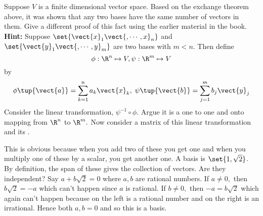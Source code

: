 \begin{enumialphparenastyle}
\begin{ex} Suppose $V$ is a finite dimensional vector space. Based on the
exchange theorem above, it was shown that any two bases have the same number
of vectors in them. Give a different proof of this fact using the earlier
material in the book. \textbf{Hint: }Suppose $\set{\vect{x}_{1}\vect{
,\cdots ,x}_{n}} $ and $\set{\vect{y}_{1}\vect{,\cdots ,y}
_{m}} $ are two bases with $m<n.$ Then define 
\begin{equation*}
\phi :\R^{n}\mapsto V,\psi :\R^{m}\mapsto V
\end{equation*}
by 
\begin{equation*}
\phi \tup{\vect{a}} = \sum_{k=1}^{n}a_{k}\vect{x}
_{k},\;\psi \tup{\vect{b}} = \sum_{j=1}^{m}b_{j}\vect{y}_{j}
\end{equation*}
Consider the linear transformation, $\psi ^{-1}\circ \phi .$ Argue it is a
one to one and onto mapping from $\R^{n}$ to $\R^{m}.$ Now
consider a matrix of this linear transformation and its {\rref}.
\begin{sol}
This is obvious because
when you add two of these you get one and when you multiply one of these by
a scalar, you get another one. A basis is $\set{1,\sqrt{2}} $. By
definition, the span of these gives the collection of vectors. Are they
independent? Say $a+b\sqrt{2}=0$ where $a,b$ are rational numbers. If $a\neq
0,$ then $b\sqrt{2}=-a$ which can't happen since $a$ is rational. If $b\neq
0,$ then $-a=b\sqrt{2}$ which again can't happen because on the left is a
rational number and on the right is an irrational. Hence both $a,b=0$ and so
this is a basis.
\end{sol}
\end{ex}

\end{enumialphparenastyle}
